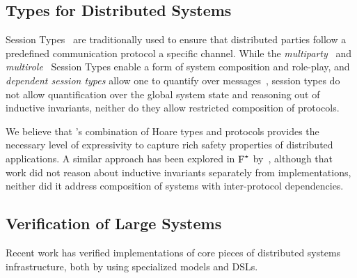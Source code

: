 \subsection{Types for Distributed Systems}
%
%
Session Types~\cite{Honda-al:ESOP98} are traditionally used to ensure
that distributed parties follow a predefined communication protocol
\wrt a specific channel. While the
\emph{multiparty}~\cite{Honda-al:POPL08} and
\emph{multirole}~\cite{Denielou-Yoshida:POPL11} Session Types enable a
form of system composition and role-play, and \emph{dependent session
  types} allow one to quantify over messages~\cite{Toninho-al:PPDP11},
session types do not allow quantification over the global system state
and reasoning out of inductive invariants, neither do they allow
restricted composition of protocols.

We believe that \disel's combination of Hoare types and protocols
provides the necessary level of expressivity to capture rich safety
properties of distributed applications.
%
A similar approach has been explored in $\text{F}^{\star}$
by~\citet{Swamy-al:ICFP11}, although that work did not reason about
inductive invariants separately from implementations, neither did it
address composition of systems with inter-protocol dependencies.

\subsection{Verification of Large Systems}

Recent work has verified implementations of core pieces of distributed
systems infrastructure, both by using specialized models and DSLs.


